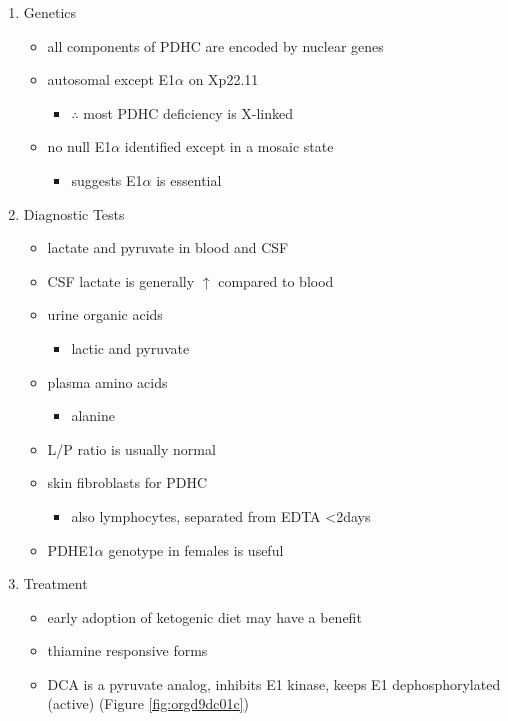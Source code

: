 \documentclass{scrartcl}
\begin{document}
\begin{enumerate}
\item Genetics
\label{sec:org82ee320}
\begin{itemize}
\item all components of PDHC are encoded by nuclear genes
\item autosomal except E1\(\alpha\) on Xp22.11
\begin{itemize}
\item \(\therefore\) most PDHC deficiency is X-linked
\end{itemize}
\item no null E1\(\alpha\) identified except in a mosaic state
\begin{itemize}
\item suggests E1\(\alpha\) is essential
\end{itemize}
\end{itemize}

\item Diagnostic Tests
\label{sec:org5327450}
\begin{itemize}
\item lactate and pyruvate in blood and CSF
\item CSF lactate is generally \(\uparrow\) compared to blood
\item urine organic acids
\begin{itemize}
\item lactic and pyruvate
\end{itemize}
\item plasma amino acids
\begin{itemize}
\item alanine
\end{itemize}
\item L/P ratio is usually normal
\item skin fibroblasts for PDHC
\begin{itemize}
\item also lymphocytes, separated from EDTA <2days
\end{itemize}
\item PDHE1\(\alpha\) genotype in females is useful
\end{itemize}

\item Treatment
\label{sec:orgf24649d}
\begin{itemize}
\item early adoption of ketogenic diet may have a benefit
\item thiamine responsive forms
\item DCA is a pyruvate analog, inhibits E1 kinase, keeps E1 dephosphorylated (active) (Figure \ref{fig:orgd9dc01c})
\end{itemize}


\end{enumerate}
\end{document}
